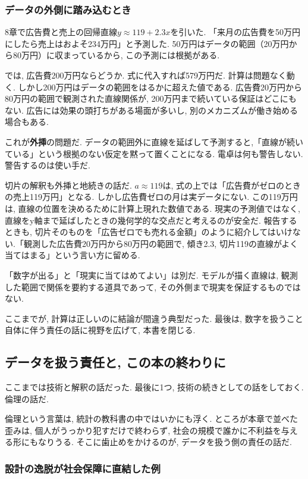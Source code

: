\subsubsection*{データの外側に踏み込むとき}

8章で広告費と売上の回帰直線$y \approx 119 + 2.3x$を引いた.
「来月の広告費を50万円にしたら売上はおよそ234万円」と予測した.
50万円はデータの範囲（20万円から80万円）に収まっているから, この予測には根拠がある.

では, 広告費200万円ならどうか.
式に代入すれば579万円だ. 計算は問題なく動く.
しかし200万円はデータの範囲をはるかに超えた値である.
広告費20万円から80万円の範囲で観測された直線関係が, 200万円まで続いている保証はどこにもない.
広告には効果の頭打ちがある場面が多いし, 別のメカニズムが働き始める場合もある.

これが\textbf{外挿}の問題だ.
データの範囲外に直線を延ばして予測すると,「直線が続いている」という根拠のない仮定を黙って置くことになる.
電卓は何も警告しない. 警告するのは使い手だ.

切片の解釈も外挿と地続きの話だ.
$a \approx 119$は, 式の上では「広告費がゼロのときの売上119万円」となる.
しかし広告費ゼロの月は実データにない.
この119万円は, 直線の位置を決めるために計算上現れた数値である. 現実の予測値ではなく, 直線をy軸まで延ばしたときの幾何学的な交点だと考えるのが安全だ.
報告するときも, 切片そのものを「広告ゼロでも売れる金額」のように紹介してはいけない.「観測した広告費20万円から80万円の範囲で, 傾き2.3, 切片119の直線がよく当てはまる」という言い方に留める.

「数字が出る」と「現実に当てはめてよい」は別だ.
モデルが描く直線は, 観測した範囲で関係を要約する道具であって, その外側まで現実を保証するものではない.

ここまでが, 計算は正しいのに結論が間違う典型だった.
最後は, 数字を扱うこと自体に伴う責任の話に視野を広げて, 本書を閉じる.


\subsection{データを扱う責任と, この本の終わりに}

ここまでは技術と解釈の話だった.
最後に1つ, 技術の続きとしての話をしておく. 倫理の話だ.

倫理という言葉は, 統計の教科書の中ではいかにも浮く.
ところが本章で並べた歪みは, 個人がうっかり犯すだけで終わらず, 社会の規模で誰かに不利益を与える形にもなりうる.
そこに歯止めをかけるのが, データを扱う側の責任の話だ.

\subsubsection*{設計の逸脱が社会保障に直結した例}

